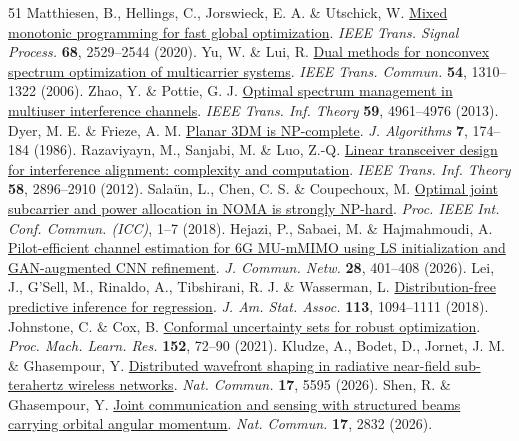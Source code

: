 \documentclass[10pt,letterpaper]{article}
\begin{document}
\begin{thebibliography}{51}
 Matthiesen, B., Hellings, C., Jorswieck, E. A. \& Utschick, W. \href{https://doi.org/10.1109/TSP.2020.2983284}{Mixed monotonic programming for fast global optimization}. \emph{IEEE Trans. Signal Process.} \textbf{68}, 2529–2544 (2020).
 Yu, W. \& Lui, R. \href{https://doi.org/10.1109/TCOMM.2006.877962}{Dual methods for nonconvex spectrum optimization of multicarrier systems}. \emph{IEEE Trans. Commun.} \textbf{54}, 1310–1322 (2006).
 Zhao, Y. \& Pottie, G. J. \href{https://doi.org/10.1109/TIT.2013.2255731}{Optimal spectrum management in multiuser interference channels}. \emph{IEEE Trans. Inf. Theory} \textbf{59}, 4961–4976 (2013).
 Dyer, M. E. \& Frieze, A. M. \href{https://doi.org/10.1016/0196-6774(86)90002-7}{Planar 3DM is NP-complete}. \emph{J. Algorithms} \textbf{7}, 174–184 (1986).
 Razaviyayn, M., Sanjabi, M. \& Luo, Z.-Q. \href{https://doi.org/10.1109/TIT.2012.2184909}{Linear transceiver design for interference alignment: complexity and computation}. \emph{IEEE Trans. Inf. Theory} \textbf{58}, 2896–2910 (2012).
 Salaün, L., Chen, C. S. \& Coupechoux, M. \href{https://doi.org/10.1109/ICC.2018.8422362}{Optimal joint subcarrier and power allocation in NOMA is strongly NP-hard}. \emph{Proc. IEEE Int. Conf. Commun. (ICC)}, 1–7 (2018).
 Hejazi, P., Sabaei, M. \& Hajmahmoudi, A. \href{https://doi.org/10.23919/JCN.2025.000112}{Pilot-efficient channel estimation for 6G MU-mMIMO using LS initialization and GAN-augmented CNN refinement}. \emph{J. Commun. Netw.} \textbf{28}, 401–408 (2026).
 Lei, J., G’Sell, M., Rinaldo, A., Tibshirani, R. J. \& Wasserman, L. \href{https://doi.org/10.1080/01621459.2017.1307116}{Distribution-free predictive inference for regression}. \emph{J. Am. Stat. Assoc.} \textbf{113}, 1094–1111 (2018).
 Johnstone, C. \& Cox, B. \href{https://proceedings.mlr.press/v152/johnstone21a.html}{Conformal uncertainty sets for robust optimization}. \emph{Proc. Mach. Learn. Res.} \textbf{152}, 72–90 (2021).
 Kludze, A., Bodet, D., Jornet, J. M. \& Ghasempour, Y. \href{https://doi.org/10.1038/s41467-026-71793-2}{Distributed wavefront shaping in radiative near-field sub-terahertz wireless networks}. \emph{Nat. Commun.} \textbf{17}, 5595 (2026).
 Shen, R. \& Ghasempour, Y. \href{https://doi.org/10.1038/s41467-026-69493-y}{Joint communication and sensing with structured beams carrying orbital angular momentum}. \emph{Nat. Commun.} \textbf{17}, 2832 (2026).

\end{thebibliography}
\end{document}
